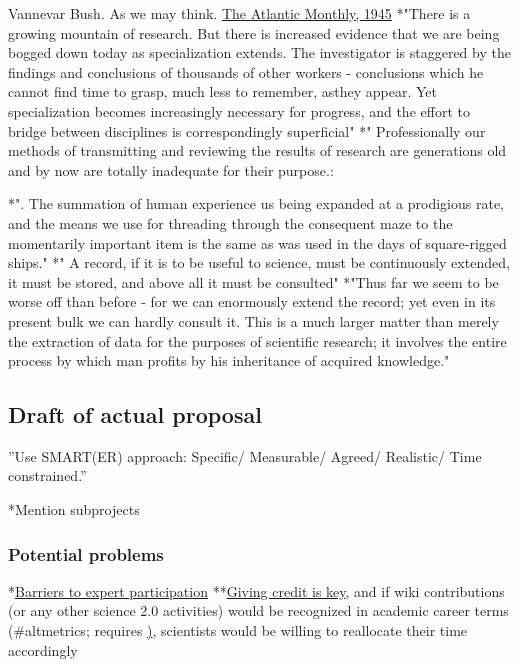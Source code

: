\documentclass[final,authoryear,3p]{elsarticle-open-drafting}
\begin{document}
Vannevar Bush. As we may think. \href{http://web.mit.edu/STS.035/www/PDFs/think.pdf}{The Atlantic Monthly, 1945}
*"There is a growing mountain of research. But there is increased evidence that we are being bogged down today as specialization extends. The investigator is staggered by the findings and conclusions of thousands of other workers - conclusions which he cannot find time to grasp, much less to remember, asthey appear. Yet specialization becomes increasingly necessary for progress, and the effort to bridge between disciplines is correspondingly superficial"
*"
Professionally our methods of transmitting and reviewing the results of research are generations old and
by now are totally inadequate for their purpose.:

*". The summation of human experience us being expanded at a prodigious rate, and
the means we use for threading through the consequent maze to the momentarily important item is the
same as was used in the days of square-rigged ships."
*"
A record, if it is to be useful to science, must be continuously extended, it must be stored, and above all it
must be consulted"
*"Thus far we seem to be worse
off than before - for we can enormously extend the record; yet even in its present bulk we can hardly
consult it. This is a much larger matter than merely the extraction of data for the purposes of scientific
research; it involves the entire process by which man profits by his inheritance of acquired knowledge."


\subsection{Draft of actual proposal}
''Use SMART(ER) approach: Specific/ 
Measurable/ 
Agreed/ 
Realistic/ 
Time constrained.''

*Mention subprojects

\subsubsection{Potential problems}
*\href{http://wikimania2011.wikimedia.org/wiki/Submissions/Barriers_and_opportunities_for_expert_participation_in_Wikipedia:_Results_from_a_survey}{Barriers to expert participation}
**\href{http://cameronneylon.net/blog/michael-nielsen-the-credit-economy-and-open-science/}{Giving credit is key}, and if wiki contributions (or any other science 2.0 activities) would be recognized in academic career terms (\#altmetrics; requires \href{http://marciovm.com/michael-nielsen-on-the-future-of-science functional reputation systems}), scientists would be willing to reallocate their time accordingly
\end{document}
